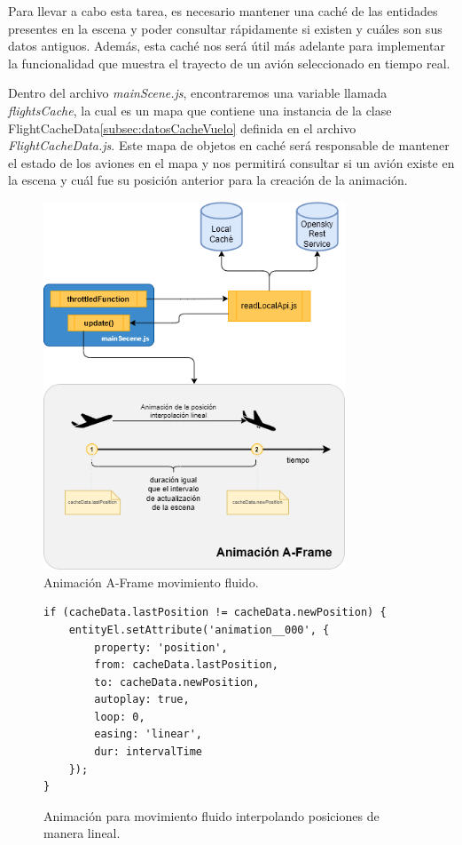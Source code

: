 \documentclass[a4paper, 11pt]{book}
\begin{document}
Para llevar a cabo esta tarea, es necesario mantener una caché de las entidades presentes en la escena y poder consultar rápidamente si existen y cuáles son sus datos antiguos. Además, esta caché nos será útil más adelante para implementar la funcionalidad que muestra el trayecto de un avión seleccionado en tiempo real.

Dentro del archivo \emph{mainScene.js}, encontraremos una variable llamada \emph{flightsCache}, la cual es un mapa que contiene una instancia de la clase FlightCacheData\ref{subsec:datosCacheVuelo} definida en el archivo \emph{FlightCacheData.js}. Este mapa de objetos en caché será responsable de mantener el estado de los aviones en el mapa y nos permitirá consultar si un avión existe en la escena y cuál fue su posición anterior para la creación de la animación.
\begin{figure}[H]
	\centering
	\includegraphics[width=9cm, keepaspectratio]{img/movimientoFluido.drawio.png}
	\caption{Animación A-Frame movimiento fluido.}
	\label{fig:movimientoFluido}
\end{figure}
\begin{figure}[H]
\centering
\begin{verbatim}
if (cacheData.lastPosition != cacheData.newPosition) {
    entityEl.setAttribute('animation__000', {
        property: 'position',
        from: cacheData.lastPosition,
        to: cacheData.newPosition,
        autoplay: true,
        loop: 0,
        easing: 'linear',
        dur: intervalTime
    });
}
\end{verbatim}
\caption{Animación para movimiento fluido interpolando posiciones de manera lineal.
\label{codigo:movimientoFluido}}
\end{figure}
\end{document}
